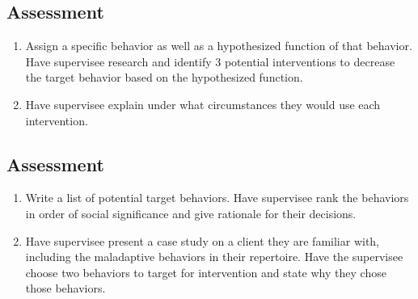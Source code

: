 \subsection{Assessment}
\begin{enumerate}
\item Assign a specific behavior as well as a hypothesized function of that behavior. Have supervisee research and identify 3 potential interventions to decrease the target behavior based on the hypothesized function. 
\item Have supervisee explain under what circumstances they would use each intervention.
%
\end{enumerate}
%
\subsection{Assessment}
\begin{enumerate}
\item Write a list of potential target behaviors. Have supervisee rank the behaviors in order of social significance and give rationale for their decisions.
\item Have supervisee present a case study on a client they are familiar with, including the maladaptive behaviors in their repertoire. Have the supervisee choose two behaviors to target for intervention and state why they chose those behaviors.
\end{enumerate}
%
